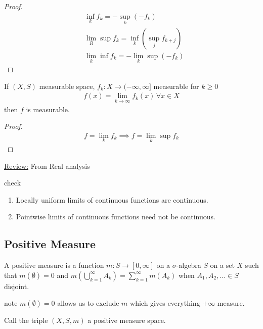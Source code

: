 \begin{proof}
	\begin{align*}
		&\inf_k f_k = - \sup_{k} (-f_k) \\
		&\lim_{R} \sup f_k = \inf_{k} (\sup_{j} f_{k+j}) \\
		&\lim_{k}\inf f_k = - \lim_{k} \sup (-f_k)
	\end{align*} 
\end{proof}

\begin{corollary}
	If $(X,S)$ measurable space, $f_k : X \to (-\infty, \infty]$ measurable for  $k \geq 0$ 
	 \begin{align*}
	    f (x) = \lim_{k \to  \infty} f_k (x) \, \forall x \in X
	\end{align*} then $f$ is measurable.
\end{corollary}

\begin{proof}
	 \begin{align*}
	f = \lim_{k} f_k \implies f = \lim_{k} \sup f_k
	\end{align*} 
\end{proof}

\underline{Review:} From Real analysis

check
\begin{enumerate}
	\item Locally uniform limits of continuous functions are continuous.
	\item Pointwise limits of continuous functions need not be continuous.
\end{enumerate}

\subsection{Positive Measure}

\begin{definition}
	A positive measure is a function $m : S \to [0, \infty]$ on a $\sigma$-algebra $S$ on a set $X$ such that $m(\emptyset) = 0$
	and $m( \bigcup_{k=1}^{\infty} A_k) = \sum_{k=1}^{\infty} m(A_k)$ when 
	$A_1, A_2, \ldots \in S$ disjoint.

	{\tiny note $m(\emptyset) = 0$ allows us to exclude $m$ which gives everything $+\infty$ measure.}

	Call the triple $(X,S,m)$ a positive measure space.
\end{definition}

